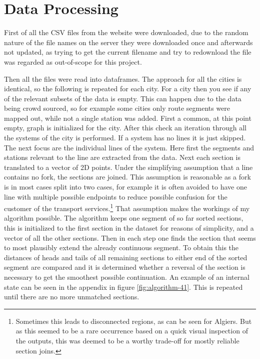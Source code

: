 \section{Data Processing}
First of all the CSV files from the website were downloaded, due to the random nature of the file names on the server they were downloaded once and afterwards not updated, as trying to get the current filename and try to redownload the file was regarded as out-of-scope for this project.

Then all the files were read into dataframes.
The approach for all the cities is identical, so the following is repeated for each city.
For a city then you see if any of the relevant subsets of the data is empty.
This can happen due to the data being crowd sourced, so for example some cities only route segments were mapped out, while not a single station was added.
First a common, at this point empty, graph is initialized for the city.
After this check an iteration through all the systems of the city is performed.
If a system has no lines it is just skipped. The next focus are the individual lines of the system.
Here first the segments and stations relevant to the line are extracted from the data.
Next each section is translated to a vector of 2D points.
Under the simplifying assumption that a line contains no fork, the sections are joined.
This assumption is reasonable as a fork is in most cases split into two cases, for example it is often avoided to have one line with multiple possible endpoints to reduce possible confusion for the customer of the transport services.\footnote{Sometimes this leads to disconnected regions, as can be seen for Algiers. But as this seemed to be a rare occurrence based on a quick visual inspection of the outputs, this was deemed to be a worthy trade-off for mostly reliable section joins.}
That assumption makes the workings of my algorithm possible.
The algorithm keeps one segment of so far sorted sections, this is initialized to the first section in the dataset for reasons of simplicity, and a vector of all the other sections. \label{sec:algorithm-41}
Then in each step one finds the section that seems to most plausibly extend the already continuous segment.
To obtain this the distances of heads and tails of all remaining sections to either end of the sorted segment are compared and it is determined whether a reversal of the section is necessary to get the smoothest possible continuation.
An example of an internal state can be seen in the appendix in figure \ref{fig:algorithm-41}.
This is repeated until there are no more unmatched sections.

